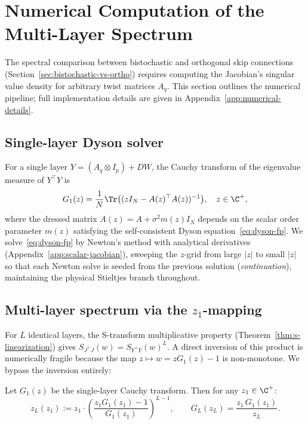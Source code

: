 
\section{Numerical Computation of the Multi-Layer Spectrum}\label{sec:numerical}

The spectral comparison between bistochastic and orthogonal skip connections (Section~\ref{sec:bistochastic-vs-ortho}) requires computing the Jacobian's singular value density for arbitrary twist matrices $A_q$. This section outlines the numerical pipeline; full implementation details are given in Appendix~\ref{app:numerical-details}.

\subsection{Single-layer Dyson solver}\label{sec:num-dyson}

For a single layer $Y = (A_q \otimes I_p) + DW$, the Cauchy transform of the eigenvalue measure of $Y^\top Y$ is
\begin{equation}\label{eq:cauchy-single}
G_1(z) = \frac{1}{N}\Tr\bigl((zI_N - A(z)^\top A(z))^{-1}\bigr), \quad z \in \C^+,
\end{equation}
where the dressed matrix $A(z) = A + \sigma^2 m(z) I_N$ depends on the scalar order parameter $m(z)$ satisfying the self-consistent Dyson equation~\eqref{eq:dyson-fp}.
We solve~\eqref{eq:dyson-fp} by Newton's method with analytical derivatives (Appendix~\ref{app:scalar-jacobian}), sweeping the $z$-grid from large $|z|$ to small $|z|$ so that each Newton solve is seeded from the previous solution (\emph{continuation}), maintaining the physical Stieltjes branch throughout.

\subsection{Multi-layer spectrum via the $z_1$-mapping}\label{sec:z1-mapping}

For $L$ identical layers, the S-transform multiplicative property (Theorem~\ref{thm:s-linearization}) gives $S_{J^\top J}(w) = S_{Y^\top Y}(w)^L$. A direct inversion of this product is numerically fragile because the map $z \mapsto w = zG_1(z) - 1$ is non-monotone. We bypass the inversion entirely:

\begin{proposition}\label{prop:z1-mapping}
Let $G_1(z)$ be the single-layer Cauchy transform. Then for any $z_1 \in \C^+$:
\begin{equation}\label{eq:z1-to-zL}
z_L(z_1) := z_1 \cdot \left(\frac{z_1 G_1(z_1) - 1}{G_1(z_1)}\right)^{L-1}, \qquad
G_L(z_L) = \frac{z_1 \, G_1(z_1)}{z_L}.
\end{equation}
\end{proposition}

